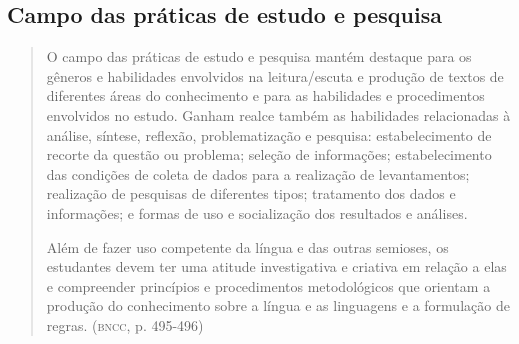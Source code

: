 \documentclass[11pt]{extarticle}
\begin{document}
\begin{enumerate}
\begin{enumerate}
\begin{enumerate}
\subsection{Campo das práticas de estudo e pesquisa}

\begin{quote}
O campo das práticas de estudo e pesquisa mantém destaque para os
gêneros e habilidades envolvidos na leitura/escuta e produção de textos
de diferentes áreas do conhecimento e para as habilidades e
procedimentos envolvidos no estudo. Ganham realce também as habilidades
relacionadas à análise, síntese, reflexão, problematização e pesquisa:
estabelecimento de recorte da questão ou problema; seleção de
informações; estabelecimento das condições de coleta de dados para a
realização de levantamentos; realização de pesquisas de diferentes
tipos; tratamento dos dados e informações; e formas de uso e
socialização dos resultados e análises.

Além de fazer uso competente da língua e das outras semioses, os
estudantes devem ter uma atitude investigativa e criativa em relação a
elas e compreender princípios e procedimentos metodológicos que orientam
a produção do conhecimento sobre a língua e as linguagens e a formulação
de regras. (\textsc{bncc}, p. 495-496)
\end{quote}


\end{enumerate}
\end{enumerate}
\end{enumerate}
\end{document}
